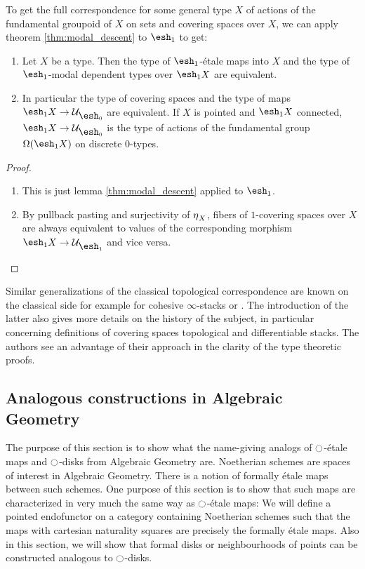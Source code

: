 \documentclass[9pt,twosided]{amsart}
\newcommand{\shape}{\ensuremath{\mathord{\raisebox{0.5pt}{\text{\rm\esh}}}}}
\begin{document}
To get the full correspondence for some general type $X$ of actions of the fundamental groupoid of $X$ on sets and covering spaces over $X$,
we can apply theorem \ref{thm:modal_descent} to $\shape_1$ to get:

\begin{thm}
  \begin{enumerate}
  \item Let $X$ be a type. Then the type of $\shape_1$-étale maps into $X$ and the type of $\shape_1$-modal dependent types over $\shape_1 X$ are equivalent.
  \item In particular the type of covering spaces and the type of maps $\shape_1X\to \mathcal U_{\shape_0}$ are equivalent.
    If $X$ is pointed and $\shape_1 X$ connected, $\shape_1X\to \mathcal U_{\shape_0}$ is the type of actions of the fundamental group $\Omega(\shape_1 X)$ on discrete $0$-types.
  \end{enumerate}
\end{thm}
\begin{proof}
  \begin{enumerate}
  \item This is just lemma \ref{thm:modal_descent} applied to $\shape_1$.
  \item By pullback pasting and surjectivity of ${\eta_{}}_X$, fibers of $1$-covering spaces over $X$ are always equivalent to values of the corresponding morphism $\shape_1 X\to \mathcal U_{\shape_1}$ and vice versa.
  \end{enumerate}
\end{proof}

Similar generalizations of the classical topological correspondence are known on the classical side
for example for cohesive $\infty$-stacks \cite[Section 5.2.7]{SchreiberDcct} or \cite{dmr-2covers}.
The introduction of the latter also gives more details on the history of the subject,
in particular concerning definitions of covering spaces topological and differentiable stacks.
The authors see an advantage of their approach in the clarity of the type theoretic proofs.

\subsection{Analogous constructions in Algebraic Geometry}
\label{subsection:algebraic geometry}
The purpose of this section is to show what the name-giving analogs of ${\ocircle}$-étale maps and ${\ocircle}$-disks from Algebraic Geometry are.
Noetherian schemes are spaces of interest in Algebraic Geometry. There is a notion of formally étale maps between such schemes.
One purpose of this section is to show that such maps are characterized in very much the same way as ${\ocircle}$-étale maps:
We will define a pointed endofunctor on a category containing Noetherian schemes
such that the maps with cartesian naturality squares are precisely the formally étale maps.
Also in this section, we will show that formal disks or neighbourhoods of points can be constructed analogous to ${\ocircle}$-disks.
\end{document}
